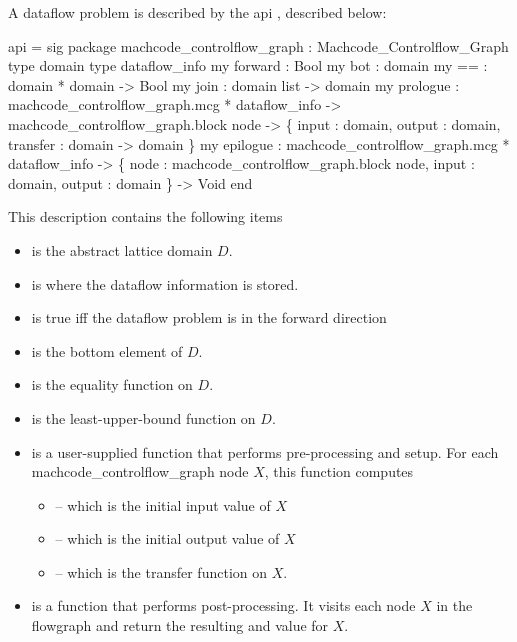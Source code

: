 A dataflow problem is described by the api , 
described below:
\begin{SML}
 api  = sig
   package machcode_controlflow_graph : Machcode_Controlflow_Graph
   type domain
   type dataflow_info
   my forward   : Bool
   my bot       : domain
   my ==        : domain * domain -> Bool
   my join      : domain list -> domain
   my prologue  : machcode_controlflow_graph.mcg * dataflow_info ->
                       machcode_controlflow_graph.block node ->
                           \{ input    : domain,
                             output   : domain,
                             transfer : domain -> domain
                           \}
   my epilogue  : machcode_controlflow_graph.mcg * dataflow_info ->
                       \{ node   : machcode_controlflow_graph.block node,
                         input  : domain,
                         output : domain
                       \} -> Void
 end
\end{SML}
This description contains the following items
\begin{itemize}
\item {} is the abstract lattice domain $D$.
\item {} is where the dataflow information
is stored.
\item {} is true iff the dataflow problem is in the
forward direction
\item {} is the bottom element of $D$.
\item \sml{==} is the equality function on $D$.
\item {} is the least-upper-bound function on $D$.
\item {} is a user-supplied function that performs
pre-processing and setup.  For each machcode_controlflow_graph node $X$, this function
computes
\begin{itemize}
 \item  {} -- which is the initial input value of $X$
 \item {} -- which is the initial output value of $X$
 \item {} -- which is the transfer function on $X$.
\end{itemize}
\item {} is a function that performs post-processing.
It visits each node $X$ in the flowgraph and return the resulting
 and  value for $X$. 
\end{itemize}

